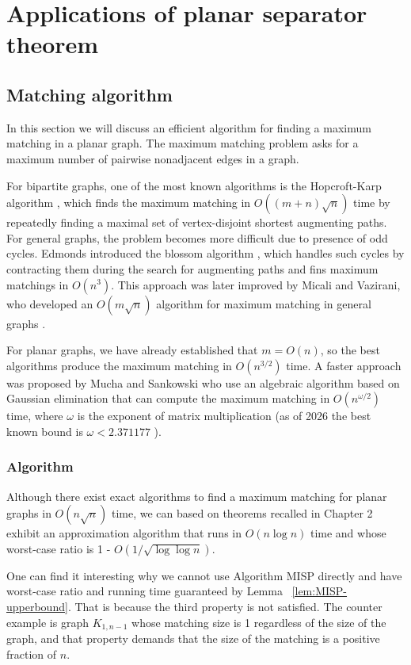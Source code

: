 \chapter{Applications of planar separator theorem}
\section{Matching algorithm}
In this section we will discuss an efficient algorithm for finding a maximum
matching in a planar graph. The maximum matching problem asks for a maximum
number of pairwise nonadjacent edges in a graph. 

For bipartite graphs, one of the most known algorithms is the Hopcroft-Karp algorithm \cite{hopcroft1973n},
which finds the maximum matching in $O((m+n)\sqrt{n})$ time by repeatedly finding a maximal
set of vertex-disjoint shortest augmenting paths. For general graphs, the problem becomes
more difficult due to presence of odd cycles. Edmonds introduced the blossom algorithm \cite{edmonds1965paths},
which handles such cycles by contracting them during the search for augmenting paths and fins maximum
matchings in $O(n^3)$.
This approach was later improved by Micali and Vazirani, who developed an $O(m\sqrt{n})$ algorithm \cite{micali1980v}
for maximum matching in general graphs .

For planar graphs, we have already established that $m = O(n)$, so the best algorithms produce 
the maximum matching in $O(n^{3/2})$ time. A faster approach was proposed by Mucha and Sankowski 
who use an algebraic algorithm \cite{mucha2006maximum} based on Gaussian elimination that can compute the maximum 
matching in $O(n^{\omega/2})$ time, where $\omega$ is the exponent of matrix multiplication (as of 2026 
the best known bound is $\omega < 2.371177$ \cite{dupont2026improvingmatrixmultiplicationexponent}).

\subsection{Algorithm}
Although there exist
exact algorithms to find a maximum matching for planar graphs in $O(n \sqrt{n})$
time, we can based on theorems recalled in Chapter 2 exhibit an approximation
algorithm that runs in $O(n \log{n})$ time and whose worst-case ratio is 1 -
$O(1/ \sqrt{\log\log n})$.

One can find it interesting why we cannot use Algorithm
\textsc{MISP} directly and have worst-case ratio and running time guaranteed by Lemma~
\ref{lem:MISP-upperbound}. That is because the third property is not
satisfied. The counter example is graph $K_{1, n-1}$ whose matching size is 1
regardless of the size of the graph, and that property demands that the size of
the matching is a positive fraction of $n$.

